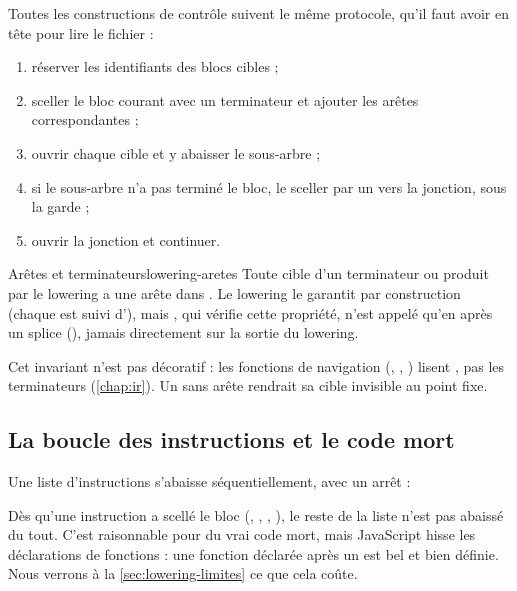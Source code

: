 Toutes les constructions de contrôle suivent le même protocole, qu'il faut avoir en tête pour lire le fichier :

\begin{enumerate}
  \item réserver les identifiants des blocs cibles ;
  \item sceller le bloc courant avec un terminateur et ajouter les arêtes correspondantes ;
  \item ouvrir chaque cible et y abaisser le sous-arbre ;
  \item si le sous-arbre n'a pas terminé le bloc, le sceller par un  vers la jonction, sous la garde  ;
  \item ouvrir la jonction et continuer.
\end{enumerate}

\begin{invariant}{Arêtes et terminateurs}{lowering-aretes}
Toute cible d'un terminateur  ou  produit par le lowering a une arête dans . Le lowering le garantit par construction (chaque  est suivi d'), mais , qui vérifie cette propriété, n'est appelé qu'en  après un splice (), jamais directement sur la sortie du lowering.
\end{invariant}

Cet invariant n'est pas décoratif : les fonctions de navigation (, , ) lisent , pas les terminateurs (\cref{chap:ir}). Un  sans arête rendrait sa cible invisible au point fixe.

\subsection{La boucle des instructions et le code mort}

Une liste d'instructions s'abaisse séquentiellement, avec un arrêt :


Dès qu'une instruction a scellé le bloc (, , , ), le reste de la liste n'est pas abaissé du tout. C'est raisonnable pour du vrai code mort, mais JavaScript hisse les déclarations de fonctions : une fonction déclarée après un  est bel et bien définie. Nous verrons à la \cref{sec:lowering-limites} ce que cela coûte.

